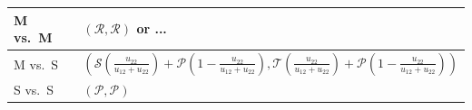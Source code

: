 \documentclass[11pt,reqno]{amsart}
\newcommand{\Rp}{\mathcal{R}}
\newcommand{\Sp}{\mathcal{S}}
\newcommand{\Tp}{\mathcal{T}}
\newcommand{\Pp}{\mathcal{P}}
\begin{document}
\begin{table}[]
\begin{tabular}{@{}ll@{}}
M vs.~M & $(\Rp,\Rp)$ or ...                                                                                                                                                                                                                                              \\ \midrule
M vs.~S & $\left(\Sp\left(\frac{u_{22}}{u_{12}+u_{22}}\right)+\Pp\left(1-\frac{u_{22}}{u_{12}+u_{22}}\right),\Tp\left(\frac{u_{22}}{u_{12}+u_{22}}\right)+\Pp\left(1-\frac{u_{22}}{u_{12}+u_{22}}\right)\right)$                                                          \\ \midrule
S vs.~S & $(\Pp, \Pp)$                                                                                                                                                                                                                                                    \\ \bottomrule
\end{tabular}
\end{table}


\bigskip
\end{document}
